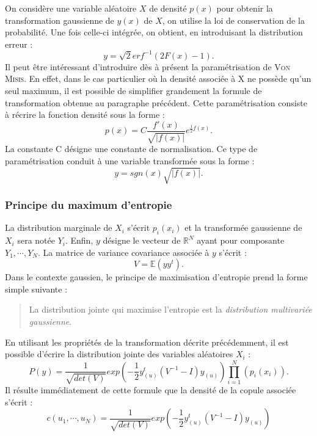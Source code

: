 \documentclass{article}
\begin{document}
On considère une variable aléatoire $ X $ de densité $ p(x) $ pour obtenir  la transformation gaussienne de $ y(x) $ de $ X $, on utilise la loi de conservation de la probabilité. Une fois celle-ci intégrée, on obtient, en introduisant la distribution erreur :
\begin{equation}
y=\sqrt{2}erf^{-1}(2F(x)-1).
\end{equation}
 Il peut être intéressant d'introduire dès à présent la paramétrisation de \textsc{Von Misis}. En effet, dans le cas particulier où la densité associée à X ne possède qu'un seul maximum, il est possible de simplifier grandement la formule de transformation obtenue au paragraphe précédent. Cette paramétrisation consiste à récrire la fonction densité sous la forme : 
 \begin{equation}
 p(x)=C\frac{f'(x)}{\sqrt{\vert f(x)\vert }}e^{\frac{1}{2}f(x)}.
 \end{equation}
 La constante C désigne une constante de normalisation. Ce type de paramétrisation conduit à une variable transformée sous la forme :
 \begin{equation}
 y=sgn(x)\sqrt{\vert f(x)\vert}.
 \end{equation}
 
  \subsubsection{Principe du maximum d'entropie}
  
  La distribution marginale de $X_{i}$ s'écrit $p_{i}(x_{i})$ et la transformée gaussienne de $X_{i}$ sera notée $Y_{i}$. Enfin, $y$ désigne le vecteur de $\mathbb{R}^{N}$ ayant pour composante $Y_{1},\cdots ,Y_{N}$.
   La matrice de variance covariance associée à $y$ s'écrit :
  \begin{equation}
  V=\mathbb{E}(yy^{t}).
  \end{equation}
   Dans le contexte gaussien, le principe de maximisation d'entropie prend la forme simple suivante :
   \begin{quote}
   La distribution jointe qui maximise l'entropie est la \emph{distribution multivariée gaussienne}. 
   \end{quote}
 En utilisant les propriétés de la transformation décrite précédemment, il est possible d'écrire la distribution jointe des variables aléatoires $X_{i}$ :
   \begin{equation}
   P(y)=\frac{1}{\sqrt{det(V)}}exp(-\frac{1}{2}y^{t}_{(u)}(V^{-1}-I)y_{(u)})\prod_{i=1}^{N}(p_{i}(x_{i})).
   \end{equation}
   Il résulte immédiatement de cette formule que la densité de la copule associée s'écrit :
   \begin{equation}
   c(u_{1},\cdots ,u_{N})=\frac{1}{\sqrt{det(V)}}exp(-\frac{1}{2}y^{t}_{(u)}(V^{-1}-I)y_{(u)})
   \end{equation}
   
\end{document}
